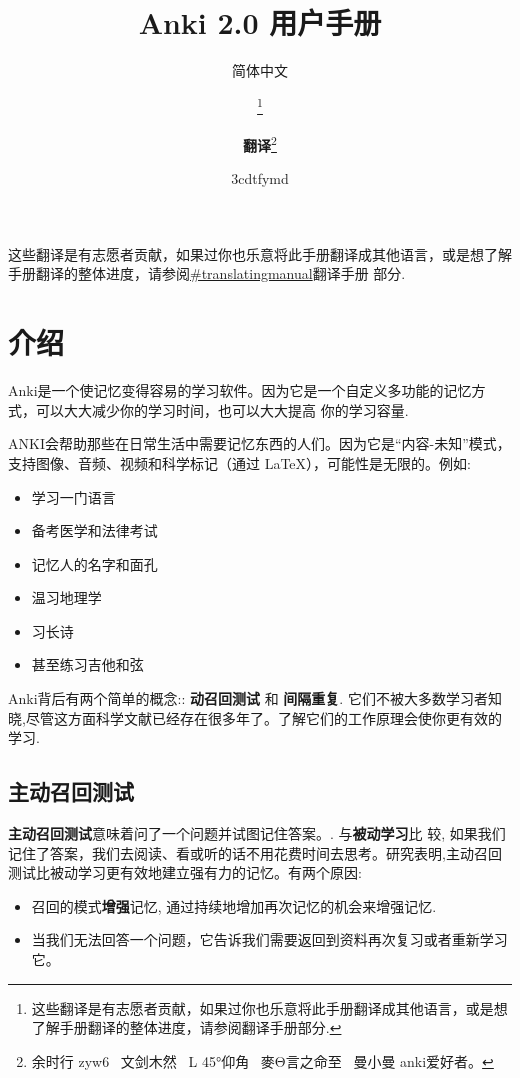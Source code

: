 \documentclass[a4paper]{book}
\title{Anki 2.0 用户手册}
\author{简体中文}
\title{\textbf{\savedtitle}}
\author{\textbf{\savedauthor}\thanks{这些翻译是有志愿者贡献，如果过你也乐意将此手册翻译成其他语言，或是想了解手册翻译的整体进度，请参阅翻译手册部分.}\and \textbf{翻译}\thanks{\ttfamily 余时行
		zyw6~
		文剑木然~
		L
		45°\hspace{-.1ex}仰角~
		麥\hspace{-.07ex}Θ\hspace{-.07ex}言之命至~
		曼小曼
		anki\hspace{-.07ex}爱好者。}}
\date{\w3cdtfymd}
\makeatletter
\let\savedauthor=\@author
\let\savedtitle=\@title
\newcounter{tab}[chapter]
\makeatother
\begin{document}
\frontmatter
\maketitle
\thispagestyle{empty}
\setcounter{tocdepth}{4}
\tableofcontents\newpage\thispagestyle{empty}

\mainmatter
\fancyhf{}
\fancyhead[LE]{{\small\leftmark}}
\fancyhead[RO]{{\small\rightmark}}
\fancyhead[RE,LO]{{\small\savedauthor\hspace*{1ex}\textbf{\savedtitle}}}
\fancyfoot[LE,RO]{\small\textbf\thepage}
\pagestyle{fancy}


这些翻译是有志愿者贡献，如果过你也乐意将此手册翻译成其他语言，或是想了解手册翻译的整体进度，请参阅\url{#translatingmanual}翻译手册 部分.

\chapter{介绍}\label{}

Anki是一个使记忆变得容易的学习软件。因为它是一个自定义多功能的记忆方式，可以大大减少你的学习时间，也可以大大提高 你的学习容量.

ANKI会帮助那些在日常生活中需要记忆东西的人们。因为它是“内容-未知”模式，支持图像、音频、视频和科学标记（通过 LaTeX），可能性是无限的。例如:

\begin{itemize}
	\itemsep1pt\parskip0pt
	\item 学习一门语言
	\item 备考医学和法律考试
	\item 记忆人的名字和面孔
	\item 温习地理学
	\item 习长诗
	\item 甚至练习吉他和弦
\end{itemize}

Anki背后有两个简单的概念:: \textbf{动召回测试 }和 \textbf{间隔重复}. 它们不被大多数学习者知晓,尽管这方面科学文献已经存在很多年了。了解它们的工作原理会使你更有效的学习.

\section{主动召回测试}
\textbf{主动召回测试}意味着问了一个问题并试图记住答案。. 与\textbf{被动学习}比 较, 如果我们记住了答案，我们去阅读、看或听的话不用花费时间去思考。研究表明,主动召回测试比被动学习更有效地建立强有力的记忆。有两个原因:

\begin{itemize}
	\itemsep1pt\parskip0pt
	\item 召回的模式\textbf{增强}记忆, 通过持续地增加再次记忆的机会来增强记忆.
	\item 当我们无法回答一个问题，它告诉我们需要返回到资料再次复习或者重新学习它。
\end{itemize}
\end{document}
